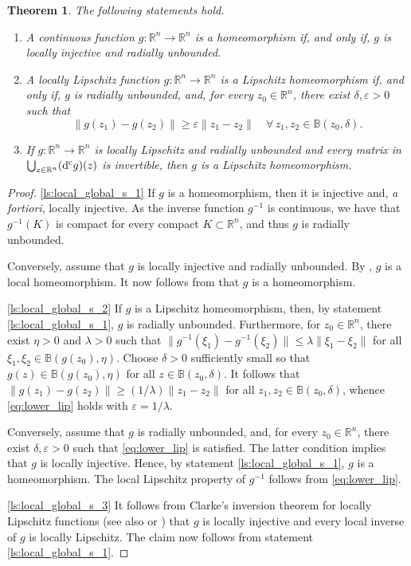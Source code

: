 \documentclass[a4paper,11pt]{article}
\newcommand{\B}{\mathbb B}
\newcommand{\R}{\mathbb R}
\numberwithin{equation}{section}
\numberwithin{figure}{section}
\numberwithin{table}{section}
\newtheorem{theorem}{Theorem}[section]
\begin{document}
\begin{theorem}\label{thm:local_global}
The following statements hold.
\begin{enumerate}[label = {\bf (\arabic*)}, ref={\rm (\arabic*)}, leftmargin = 0ex, itemindent = 4.6ex]
\item\label{ls:local_global_s_1}
A continuous function $g:\R^n\to\R^n$ is a homeomorphism if, and only if, $g$ is locally injective and radially unbounded.
%
\item\label{ls:local_global_s_2}
A locally Lipschitz function $g:\R^n\to\R^n$ is a Lipschitz homeomorphism if, and only if, $g$ is radially unbounded, and, for every $z_0\in\R^n$, there exist $\delta,\varepsilon>0$ such that
\begin{equation}\label{eq:lower_lip}
\|g(z_1)-g(z_2)\|\geq\varepsilon\|z_1-z_2\|\quad\forall\,z_1,z_2\in\B(z_0,\delta).
\end{equation}
%
\item\label{ls:local_global_s_3}
If $g:\R^n\to\R^n$ is locally Lipschitz and radially unbounded and every matrix in $\bigcup_{z\in\R^n}({\rm d}^{\rm c}g)(z)$ is invertible, then $g$ is a Lipschitz homeomorphism.
\end{enumerate}
\end{theorem}
%
\begin{proof} \ref{ls:local_global_s_1} If $g$ is a homeomorphism, then it is injective and, {\it a fortiori}, locally injective. As the inverse function $g^{-1}$ is continuous, we have that $g^{-1}(K)$ is compact for every compact $K\subset\R^n$, and thus $g$ is radially unbounded.

Conversely, assume that $g$ is locally injective and radially unbounded. By , $g$ is a local homeomorphism. It now follows
from \cite[Theorem 1.8, Chapter 3]{ap95} that $g$ is a homeomorphism.

\ref{ls:local_global_s_2} If $g$ is a Lipschitz homeomorphism, then, by statement \ref{ls:local_global_s_1}, $g$ is radially
unbounded. Furthermore, for $z_0\in\R^n$, there exist $\eta>0$ and $\lambda>0$ such that
$\|g^{-1}(\xi_1)-g^{-1}(\xi_2)\|\leq\lambda\|\xi_1-\xi_2\|$ for all $\xi_1,\xi_2\in\B(g(z_0),\eta)$.
Choose $\delta>0$ sufficiently small so that $g(z)\in\B(g(z_0),\eta)$ for all $z\in\B(z_0,\delta)$.
It follows that $\|g(z_1)-g(z_2)\|\geq(1/\lambda)\|z_1-z_2\|$ for all $z_1,z_2\in\B(z_0,\delta)$, whence \eqref{eq:lower_lip} holds with $\varepsilon=1/\lambda$.

Conversely, assume that $g$ is radially unbounded, and, for every $z_0\in\R^n$, there exist $\delta,\varepsilon>0$ such that \eqref{eq:lower_lip} is satisfied. The latter condition
implies that $g$ is locally injective. Hence, by statement \ref{ls:local_global_s_1}, $g$ is a homeomorphism. The local Lipschitz property of $g^{-1}$ follows from \eqref{eq:lower_lip}.

\ref{ls:local_global_s_3} It follows from Clarke's inversion theorem
for locally Lipschitz functions \cite{c76} (see also \cite[Theorem 7.1.1]{c90} or
\cite[Theorem 3.12, Chapter 3]{clsw98}) that $g$ is locally injective and every local inverse of $g$ is locally Lipschitz. The claim now follows from statement \ref{ls:local_global_s_1}.
\end{proof}
\end{document}
